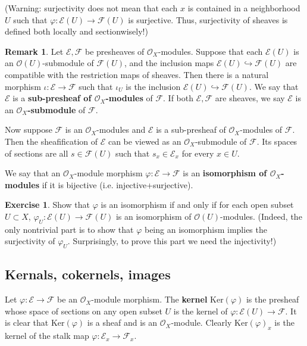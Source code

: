 \documentclass[12pt,a4paper,notitlepage]{article}
\theoremstyle{definition}
\newtheorem{exe}[df]{Exercise}
\newtheorem{rem}[df]{Remark}
\theoremstyle{plain}
\newcommand{\scr}{\mathscr}
\newcommand{\Ker}{\mathrm{Ker}}
\numberwithin{equation}{section}
\begin{document}
(Warning: surjectivity does not mean that each $x$ is contained in a neighborhood $U$ such that $\varphi:\scr E(U)\rightarrow\scr F(U)$ is surjective. Thus, surjectivity of sheaves is defined both locally and sectionwisely!)



\begin{rem}\label{lb102}
	Let $\scr E,\scr F$ be presheaves of $\scr O_X$-modules. Suppose that each $\scr E(U)$ is an $\scr O(U)$-submodule of $\scr F(U)$, and the inclusion maps $\scr E(U)\hookrightarrow\scr F(U)$ are compatible with the restriction maps of sheaves. Then there is a natural  morphism $\iota:\scr E\rightarrow\scr F$ such that $\iota_U$ is the inclusion $\scr E(U)\hookrightarrow\scr F(U)$. We say that $\scr E$ is a \textbf{sub-presheaf of $\scr O_X$-modules}  of $\scr F$. If both $\scr E,\scr F$ are sheaves, we say $\scr E$ is an \textbf{$\scr O_X$-submodule} of $\scr F$.
	
	Now suppose $\scr F$ is an $\scr O_X$-modules and $\scr E$ is a sub-presheaf of $\scr O_X$-modules of $\scr F$. Then the sheafification of $\scr E$ can be viewed as an $\scr O_X$-submodule of $\scr F$. Its spaces of sections are all $s\in\scr F(U)$ such that $s_x\in\scr E_x$ for every $x\in U$. \hfill\qedsymbol
\end{rem}

We say that an $\scr O_X$-module morphism $\varphi:\scr E\rightarrow\scr F$ is an \textbf{isomorphism of $\scr O_X$-modules} if it is bijective (i.e. injective+surjective). 
\begin{exe}
	Show that $\varphi$ is an isomorphism if and only if for each open subset $U\subset X$, $\varphi_U:\scr E(U)\rightarrow\scr F(U)$ is an isomorphism of $\scr O(U)$-modules. (Indeed, the only nontrivial part is to show that $\varphi$ being an isomorphism implies the surjectivity of $\varphi_U$. Surprisingly, to prove this part we need the injectivity!) 
\end{exe}


\subsection{Kernals, cokernels, images}


Let $\varphi:\scr E\rightarrow\scr F$ be an $\scr O_X$-module morphism. The \textbf{kernel} $\Ker(\varphi)$ is the presheaf whose space of sections on any open subset $U$ is the kernel of $\varphi:\scr E(U)\rightarrow\scr F$. It is clear that $\Ker(\varphi)$ is a sheaf and is an $\scr O_X$-module. Clearly $\Ker(\varphi)_x$ is the kernel of the stalk map $\varphi:\scr E_x\rightarrow\scr F_x$.
\end{document}
